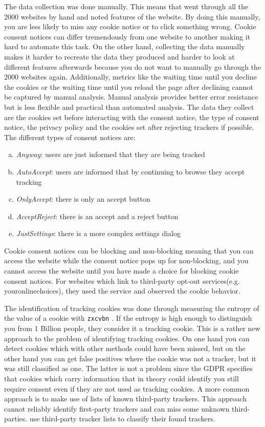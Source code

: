 The data collection was done manually. This means that \citeauthor{sanchez2019can} went through all the 2000 websites by
hand and noted features of the website. By doing this manually, you are less likely to miss any cookie notice or to
click something wrong. Cookie consent notices can differ tremendously from one website to another making it hard to
automate this task. On the other hand, collecting the data manually makes it harder to recreate the data they produced
and harder to look at different features afterwards because you do not want to manually go through the 2000 websites
again. Additionally, metrics like the waiting time until you decline the cookies or the waiting time until you reload
the page after declining cannot be captured by manual analysis. Manual analysis provides better error resistance but is
less flexible and practical than automated analysis. The data they collect are the cookies set before interacting with the
consent notice, the type of consent notice, the privacy policy and the cookies set after rejecting trackers if possible.
The different types of consent notices are:
\begin{enumerate}[a)]
    \item \emph{Anyway}: users are just informed that they are being tracked
    \item \emph{AutoAccept}: users are informed that by continuing to browse they accept tracking
    \item \emph{OnlyAccept}: there is only an accept button
    \item \emph{AcceptReject}: there is an accept and a reject button
    \item \emph{JustSettings}: there is a more complex settings dialog
\end{enumerate}
Cookie consent notices can be blocking and non-blocking meaning that you can access the website while the consent notice pops up for
non-blocking, and you cannot access the website until you have made a choice for blocking cookie consent notices. For
websites which link to third-party opt-out services(e.g. youronlinechoices), they used the service and observed the
cookie behavior.

The identification of tracking cookies was done through measuring the entropy of the value of a cookie with
\texttt{zxcvbn} \cite{wheeler2016zxcvbn}. If the entropy is high enough to distinguish you from 1 Billion people, they
consider it a tracking cookie. This is a rather new approach to the problem of identifying tracking cookies.
On one hand you can detect cookies which with other methods could have been missed, but on the other hand you can get false positives
where the cookie was not a tracker, but it was still classified as one. The latter is not a problem since the
GDPR specifies that cookies which carry information that in theory could identify you still require consent even if they
are not used as tracking cookies.
A more common approach is to make use of lists of known third-party trackers. This approach cannot reliably identify
first-party trackers and can miss some unknown third-parties. \citeauthor{sanchez2019can} use third-party tracker lists
to classify their found trackers.

